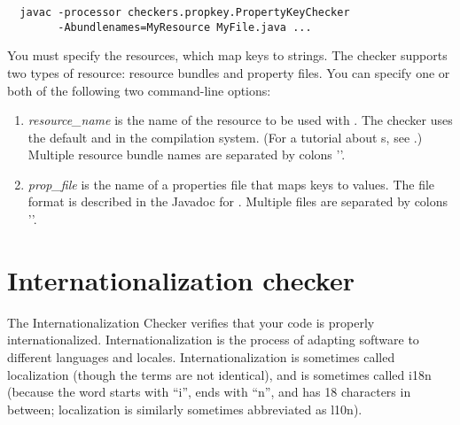 \begin{Verbatim}
  javac -processor checkers.propkey.PropertyKeyChecker
        -Abundlenames=MyResource MyFile.java ...
\end{Verbatim}

You must specify the resources, which map keys to strings.
The checker supports two types of resource:
resource bundles and property files.  You can specify one or both of the
following two command-line options:

\begin{enumerate}

\item {}

  \emph{resource\_name} is the name of the resource to be used with
  .
  The checker uses the default  and  in the
  compilation system.
  (For a tutorial about s, see
  .)
  Multiple resource bundle names are separated by colons '\code{:}'.

\item {}

  \emph{prop\_file} is the name of a properties file that maps
  keys to values.  The file format is described in
  the Javadoc for 
  .
  Multiple files are separated by colons '\code{:}'.

\end{enumerate}



\section{Internationalization checker\label{i18n-checker}}

The Internationalization Checker verifies that your code is properly
internationalized.  Internationalization is the process of adapting
software to different languages and locales.  Internationalization is
sometimes called localization (though the terms are not
identical), and is sometimes called i18n (because the word starts with ``i'',
ends with ``n'', and has 18 characters in between; localization is similarly
sometimes abbreviated as l10n).

